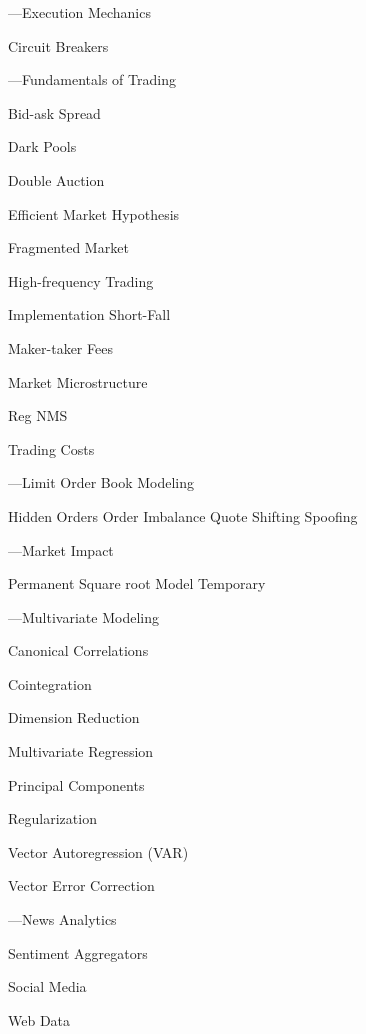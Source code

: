 \begin{minipage}{0.40\textwidth}
\noindent ---Execution Mechanics
	\begin{flushright}
	Circuit Breakers	
	\end{flushright}


\noindent ---Fundamentals of Trading 
	\begin{flushright}
	Bid-ask Spread \par
	Dark Pools \par
	Double Auction \par
	Efficient Market Hypothesis \par
	Fragmented Market \par
	High-frequency Trading \par
	Implementation Short-Fall \par
	Maker-taker Fees \par
	Market Microstructure \par
	Reg NMS \par
	Trading Costs
	\end{flushright}


\noindent ---Limit Order Book Modeling
	\begin{flushright}
	Hidden Orders
	Order Imbalance
	Quote Shifting
	Spoofing
	\end{flushright}


\noindent ---Market Impact
	\begin{flushright}
	Permanent 
	Square root Model
	Temporary
	\end{flushright}


\noindent ---Multivariate Modeling
	\begin{flushright}
	Canonical Correlations \par
	Cointegration \par
	Dimension Reduction \par
	Multivariate Regression \par
	Principal Components \par
	Regularization \par
	Vector Autoregression (VAR) \par
	Vector Error Correction
	\end{flushright}


\noindent ---News Analytics
	\begin{flushright}
	Sentiment Aggregators \par
	Social Media \par
	Web Data 
	\end{flushright}
\end{minipage} \newpage
